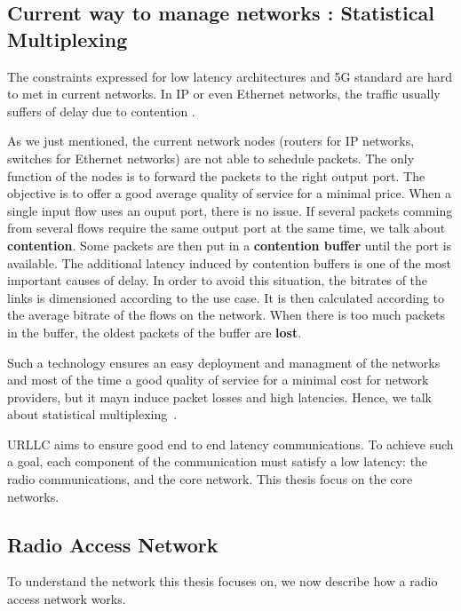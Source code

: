 \subsection{Current way to manage networks : Statistical Multiplexing}


The constraints expressed for low latency architectures and 5G standard are hard to met in current networks. In IP or even Ethernet networks, the traffic usually suffers of delay due to contention        . 

As we just mentioned, the current network nodes (routers for IP networks, switches for Ethernet networks) are not able to schedule packets. The only function of the nodes is to forward the packets to the right output port.
The objective is to offer a good average quality of service for a minimal price. When a single input flow uses an ouput port, there is no issue.
 If several packets comming from several flows require the same output port at the same time, we talk about \textbf{contention}. Some packets are then put in a \textbf{contention buffer} until the port is available. The additional latency induced by contention buffers is one of the most important causes of delay. In order to avoid this situation, the bitrates of the links is dimensioned according to the use case. It is then calculated according to the average bitrate of the flows on the network. 
 When there is too much packets in the buffer, the oldest packets of the buffer are \textbf{lost}. 

Such a technology ensures an easy deployment and managment of the networks and most of the time a good quality of service for a minimal cost for network providers, but it mayn induce packet losses and high latencies. Hence, we talk about statistical multiplexing~\cite{krishnamurthy2003latency,venkatramani1994supporting}. 

URLLC aims to ensure good end to end latency communications. To achieve such a goal, each component of the communication must satisfy a low latency: the radio communications, and the core network. This thesis focus on the core networks. 

\subsection{\textbf{R}adio \textbf{A}ccess \textbf{N}etwork}
To understand the network this thesis focuses on, we now describe how a radio access network works.

